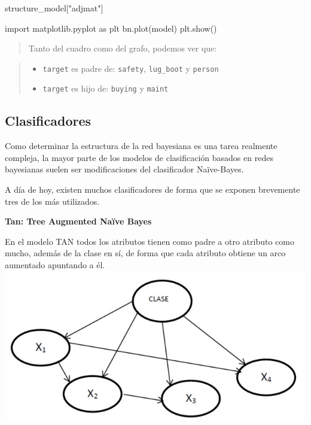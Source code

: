 \documentclass[
  a4paper,
  DIV=11,
  numbers=noendperiod]{scrreprt}
\newenvironment{Shaded}{\begin{snugshade}}{\end{snugshade}}
\newcommand{\ImportTok}[1]{#1}
\newcommand{\NormalTok}[1]{#1}
\newcommand{\StringTok}[1]{\textcolor[rgb]{0.31,0.60,0.02}{#1}}
\providecommand{\tightlist}{%
  \setlength{\itemsep}{0pt}\setlength{\parskip}{0pt}}\usepackage{longtable,booktabs,array}
\begin{document}
\begin{Shaded}
\begin{Highlighting}[numbers=left,,]
\NormalTok{structure\_model[}\StringTok{"adjmat"}\NormalTok{]}
\end{Highlighting}
\end{Shaded}

\begin{Shaded}
\begin{Highlighting}[numbers=left,,]
\ImportTok{import}\NormalTok{ matplotlib.pyplot }\ImportTok{as}\NormalTok{ plt}
\NormalTok{bn.plot(model)}
\NormalTok{plt.show()}
\end{Highlighting}
\end{Shaded}

\begin{quote}
Tanto del cuadro como del grafo, podemos ver que:
\end{quote}

\begin{quote}
\begin{itemize}
\tightlist
\item
  \texttt{target} es padre de: \texttt{safety}, \texttt{lug\_boot} y
  \texttt{person}
\item
  \texttt{target} es hijo de: \texttt{buying} y \texttt{maint}
\end{itemize}
\end{quote}

\subsection{Clasificadores}\label{clasificadores}

Como determinar la estructura de la red bayesiana es una tarea realmente
compleja, la mayor parte de los modelos de clasificación basados en
redes bayesianas suelen ser modificaciones del clasificador Naïve-Bayes.

A día de hoy, existen muchos clasificadores de forma que se exponen
brevemente tres de los más utilizados.

\textbf{Tan: Tree Augmented Naïve Bayes}

En el modelo TAN todos los atributos tienen como padre a otro atributo
como mucho, además de la clase en sí, de forma que cada atributo obtiene
un arco aumentado apuntando a él.
\includegraphics{imagenes/capitulo2/modelo_tan.jpg}
\end{document}
